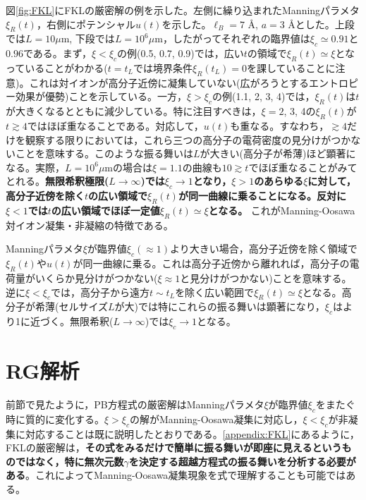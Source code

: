 \documentclass[11pt,a4paper]{ltjsarticle}
\theoremstyle{definition}
\theoremstyle{remark}
\begin{document}
図\ref{fig:FKL}にFKLの厳密解の例を示した。左側に繰り込まれたManningパラメタ$\xi_R(t)$，右側にポテンシャル$u(t)$を示した。$\ell_B=7$ \AA , $a=3$ \AA とした。上段では$L=10 \mu$m, 下段では$L=10^6 \mu$m，したがってそれぞれの臨界値は$\xi_c\simeq0.91$と$0.96$である。まず，$\xi<\xi_c$の例(0.5, 0.7, 0.9)では，広い$t$の領域で$\xi_R(t)\simeq\xi$となっていることがわかる($t=t_L$では境界条件$\xi_R(t_L)=0$を課していることに注意)。これは対イオンが高分子近傍に凝集していない(広がろうとするエントロピー効果が優勢)ことを示している。一方，$\xi>\xi_c$の例(1.1, 2, 3, 4)では，$\xi_R(t)$は$t$が大きくなるとともに減少している。特に注目すべきは，$\xi=2$, 3, 4の$\xi_R(t)$が$t\gtrsim 4$ではほぼ重なることである。対応して，$u(t)$も重なる。すなわち，$\gtrsim 4$だけを観察する限りにおいては，これら三つの高分子の電荷密度の見分けがつかないことを意味する。このような振る舞いは$L$が大きい(高分子が希薄)ほど顕著になる。実際，$L=10^6\mu$mの場合は$\xi=1.1$の曲線も$10\gtrsim t$でほぼ重なることがみてとれる。\textbf{無限希釈極限($L\to\infty$)では$\xi_c\to1$となり，$\xi>1$のあらゆる$\xi$に対して，高分子近傍を除く$t$の広い領域で$\xi_R(t)$が同一曲線に乗ることになる。反対に$\xi<1$では$t$の広い領域でほぼ一定値$\xi_R(t)\simeq \xi$となる。} これがManning-Oosawa 対イオン凝集・非凝縮の特徴である。

\begin{pointbox}[title=重要(FKLの厳密解の特徴)]
Manningパラメタ$\xi$が臨界値$\xi_c(\approx 1)$より大きい場合，高分子近傍を除く領域で$\xi_R(t)$や$u(t)$が同一曲線に乗る。これは高分子近傍から離れれば，高分子の電荷量がいくらか見分けがつかない($\xi\approx 1$と見分けがつかない)ことを意味する。逆に$\xi<\xi_c$では，高分子から遠方$t\sim t_L$を除く広い範囲で$\xi_R(t)\simeq \xi$となる。高分子が希薄(セルサイズ$L$が大)では特にこれらの振る舞いは顕著になり，$\xi_c$はより1に近づく。無限希釈($L\to\infty$)では$\xi_c\to 1$となる。
\end{pointbox}

\section{RG解析}
前節で見たように，PB方程式の厳密解はManningパラメタ$\xi$が臨界値$\xi_c$をまたぐ時に質的に変化する。$\xi>\xi_c$の解がManning-Oosawa凝集に対応し，$\xi<\xi_c$が非凝集に対応することは既に説明したとおりである。\ref{appendix:FKL}にあるように，FKLの厳密解は，\textbf{その式をみるだけで簡単に振る舞いが即座に見えるというものではなく，特に無次元数$\gamma$を決定する超越方程式の振る舞いを分析する必要がある}。これによってManning-Oosawa凝集現象を式で理解することも可能ではある。
\end{document}
